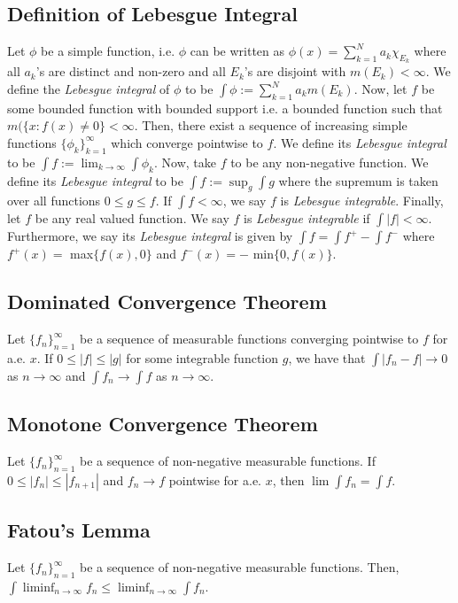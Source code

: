 \documentclass[11pt]{amsart}
\begin{document}
\subsection*{Definition of Lebesgue Integral} Let $\phi$ be a simple function, i.e. $\phi$ can be written as $\phi(x) = \sum_{k=1}^N a_k\chi_{E_k}$ where all $a_k$'s are distinct
and non-zero and all $E_k$'s are disjoint with $m(E_k)<\infty$. We define the \textit{Lebesgue integral} of $\phi$ to be $\int \phi := \sum_{k=1}^N a_km(E_k)$. Now, let $f$ be
some bounded function with bounded support i.e. a bounded function such that $m(\{x:f(x)\neq 0\}<\infty$. Then, there exist a sequence of increasing simple functions
$\{\phi_k\}_{k=1}^{\infty}$ which converge pointwise to $f$. We define its \textit{Lebesgue integral} to be $\int f := \lim_{k\to\infty} \int \phi_k$. Now, take $f$ to be any non-negative
function. We define its \textit{Lebesgue integral} to be $\int f := \sup_g \int g$ where the supremum is taken over all functions $0\leq g\leq f$. If $\int f<\infty$, we say $f$
is \textit{Lebesgue integrable}. Finally, let $f$ be any real valued function. We say $f$ is \textit{Lebesgue integrable} if $\int |f|<\infty$. Furthermore, we say its \textit{Lebesgue
integral} is given by $\int f = \int f^{+} - \int f^{-}$ where $f^{+}(x) =$ max$\{f(x),0\}$ and $f^{-}(x) = -$ min$\{0,f(x)\}$.

\subsection*{Dominated Convergence Theorem} Let $\{f_n\}_{n=1}^{\infty}$ be a sequence of measurable functions converging pointwise to $f$ for a.e. $x$. If $0\leq |f|\leq |g|$ for some
integrable function $g$, we have that $\int |f_n - f| \to 0$ as $n\to\infty$ and $\int f_n \to \int f$ as $n\to\infty$.

\subsection*{Monotone Convergence Theorem} Let $\{f_n\}_{n=1}^{\infty}$ be a sequence of non-negative measurable functions. If $0\leq |f_n|\leq |f_{n+1}|$ and
$f_n\to f$ pointwise for a.e. $x$, then $\lim \int f_n = \int f$.

\subsection*{Fatou's Lemma} Let $\{f_n\}_{n=1}^{\infty}$ be a sequence of non-negative measurable functions. Then, $\int \liminf_{n\to\infty} f_n \leq \liminf_{n\to\infty} \int f_n$.
\end{document}
